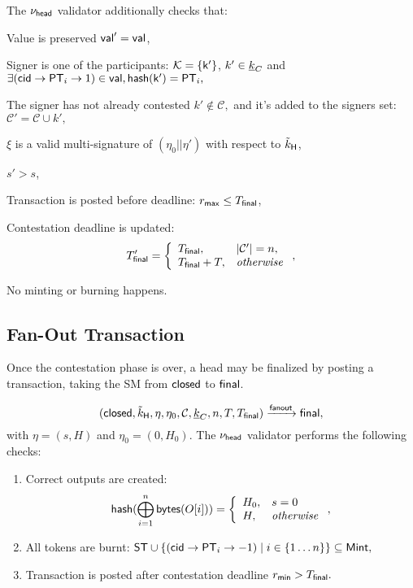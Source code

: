 \noindent The $\nu_\mathsf{head}$ validator additionally checks that:
\begin{menumerate}
  \item Value is preserved $\mathsf{val}' = \mathsf{val}$,
  \item Signer is one of the participants: $\mathcal K = \{\mathsf{k'}\}$, $k' \in \underline{k}_C$ and
    $
    \exists (\mathsf{cid} \rightarrow \mathsf{PT}_i \rightarrow 1) \in \mathsf{val}, \mathsf{hash}(\mathsf{k'}) = \mathsf{PT}_i,
    $
  \item The signer has not already contested $k' \not\in \mathcal{C},$  and it's added to the signers set: $\mathcal{C}' = \mathcal{C} \cup k',$
  \item $\xi$ is a valid multi-signature of $(\eta_0 || \eta')$ with respect to $\tilde{k}_{\mathsf{H}}$, 
  \item $s' > s$, 
  \item Transaction is posted before deadline: $r_{\mathsf{max}} \leq T_{\mathsf{final}}$,
  \item Contestation deadline is updated:
     $$
     T_{\mathsf{final}}' = 
        \left\{\begin{array}{ll}
             T_{\mathsf{final}},     &  |\mathcal{C}'| = n, \\
             T_{\mathsf{final}} + T, &  \mathit{otherwise} \\
        \end{array}\right.,
     $$
  \item No minting or burning happens.
\end{menumerate}


\subsection{Fan-Out Transaction}  



Once the contestation phase is over, a head
may be finalized by posting a \mtxFanout{} transaction, taking the SM
from $\mathsf{closed}$ to $\mathsf{final}$.  

$$
   (\mathsf{closed},\tilde{k}_{\mathsf{H}},\eta,\eta_0,\mathcal{C},\underline{k}_C,n,T,T_{\mathsf{final}}) \xrightarrow{\mathsf{fanout}} \mathsf{final},
$$
with $\eta = (s, H)$ and $\eta_0 = (0, H_0).$
The $\nu_\mathsf{head}$ validator performs the following checks:
\begin{enumerate}
  \item Correct outputs are created: 
  $$
  \mathsf{hash}(\bigoplus_{i=1}^n \mathsf{bytes}(O[i])) = 
    \left\{
    \begin{array}{ll}
        H_0, & s = 0 \\
        H, &\mathit{otherwise}
    \end{array}
    \right.,
  $$
  \item All tokens are burnt: 
     $\mathsf{ST} \cup \{(\mathsf{cid} \rightarrow \mathsf{PT}_i \rightarrow -1) \mid i \in \{1\dots n\}\} \subseteq \mathsf{Mint},$
  \item Transaction is posted after contestation deadline $r_{\mathsf{min}} > T_{\mathsf{final}}.$
\end{enumerate}

